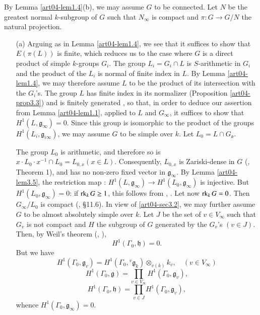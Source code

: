 By Lemma \ref{art04-lem1.4}(b), we may assume $G$ to be connected. Let $N$ be the greatest normal $k$-subgroup of $G$ such that $N_{\infty}$ is compact and $\pi:G\to G/N$ the natural projection.
\begin{itemize}
\item[(a)] Arguing as in Lemma \ref{art04-lem1.4}, we see that it suffices to show that $E(\pi(L))$ is finite, which reduces us to the case where $G$ is a direct product of simple $k$-groups $G_{i}$. The group $L_{i}=G_{i}\cap L$ is $S$-arithmetic in $G_{i}$ and the product of the $L_{i}$ is normal of finite index in $L$. By Lemma \ref{art04-lem1.4}, we may therefore assume $L$ to be the product of its intersection with the $G_{i}$'s. The group $L$ has finite index in its normalizer (Proposition \ref{art04-prop3.3}) and is finitely generated \cite{art04-key17}, so that, in order to deduce our assertion from Lemma \ref{art04-lem1.1}, applied to $L$ and $G_{\infty}$, it suffices to show that $H^{1}(L,\mathfrak{g}_{\infty})=0$. Since this group is isomorphic to the product of the groups $H^{1}(L_{i},\mathfrak{g}_{i\infty})$, we may assume $G$ to be simple over $k$. Let $L_{0}=L\cap G_{\mathfrak{o}}$.

The group $L_{0}$ is arithmetic, and therefore so is $x\cdot L_{0}\cdot x^{-1}\cap L_{0}=L_{0,x}(x\in L)$. Consequently, $L_{0,x}$ is Zariski-dense in $G$ (\cite{art04-key6}, Theorem 1), and has no non-zero fixed vector in $\mathfrak{g}_{\infty}$. By Lemma \ref{art04-lem3.5}, the restriction map : $H^{1}(L,\mathfrak{g}_{\infty})\to H^{1}(L_{0},\mathfrak{g}_{\infty})$ is injective. But $H^{1}(L_{0},\mathfrak{g}_{\infty})=0$: if $\operatorname{\mathrm{rk}}_{k}G\geq 1$, this follows from \cite{art04-key25}, \cite{art04-key26}. Let now $\operatorname{\mathrm{rk}}_{k}G=0$. Then $G_{\infty}/L_{0}$ is compact (\cite{art04-key4}, \S11.6). In view of \ref{art04-sec3.2}, we may further assume $G$ to be almost absolutely simple over $k$. Let $J$ be the set of $v\in V_{\infty}$ such that $G_{v}$ is not compact and $H$ the subgroup of $G$ generated by the $G_{v}$'s $(v\in J)$. Then, by Weil's theorem (\cite{art04-key32}, \cite{art04-key33}),
\setcounter{equation}{0}
\begin{equation}
H^{1}(\Gamma_{0},\mathfrak{h})=0.\label{art04-thm3.6-eq1}
\end{equation}
But we have
\begin{equation}
H^{1}(\Gamma_{0},\mathfrak{g}_{v})=H^{1}(\Gamma_{0},{}^{v}\mathfrak{g}_{k})\otimes_{v(k)}k_{v},\quad (v\in V_{\infty})\label{art04-thm3.6-eq2}
\end{equation}
\begin{equation}
H^{1}(\Gamma_{0},\mathfrak{g})=\prod\limits_{v\in V_{\infty}}H^{1}(\Gamma_{0},\mathfrak{g}_{v}),\label{art04-thm3.6-eq3}
\end{equation}
\begin{equation}
H^{1}(\Gamma_{0},\mathfrak{h})=\prod\limits_{v\in J}H^{1}(\Gamma_{0},\mathfrak{g}_{v}),\label{art04-thm3.6-eq4}
\end{equation}
whence $H^{1}(\Gamma_{0},\mathfrak{g}_{\infty})=0$.


\end{itemize}

